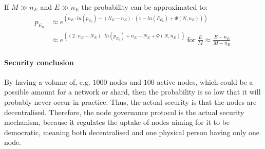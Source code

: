 If $M \gg n_E$ and $E \gg n_E$ the probability can be approximated to:
\begin{align*}
 p_{E_n} & \approx e^{(n_E \cdot ln(p_{E_0})-(N_E-n_E) \cdot (1-ln(P_{E_0})+\Phi(N,n_E)))} \\ 
         &\approx e^{((2 \cdot n_E - N_E) \cdot ln(p_{E_0}) + n_E - N_E + \Phi(N,n_E))} ~ 
 \text{for} ~ \frac{E}{M} \approx \frac{E-n_E}{M-n_E}
\
\end{align*}

\paragraph{Security conclusion\\}
By having a volume of, e.g. $1000$ nodes and $100$ active nodes, which could be a possible amount for a network or shard, then the probability is so low that it will probably never occur in practice. Thus, the actual security is that the nodes are decentralised. Therefore, the node governance protocol is the actual security mechanism, because it regulates the uptake of nodes aiming for it to be democratic, meaning both decentralised and one physical person having only one node.  
